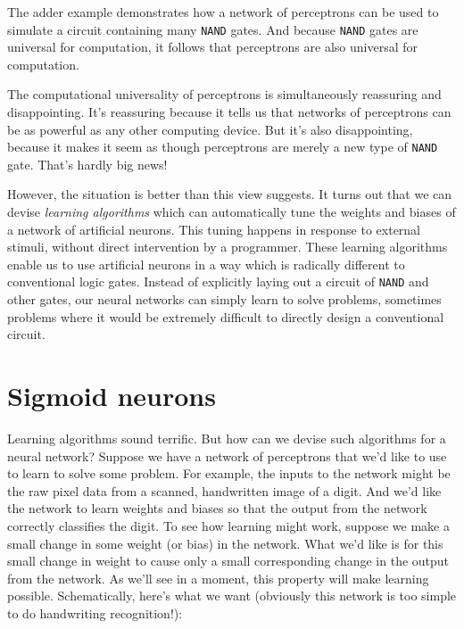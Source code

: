 The adder example demonstrates how a network of perceptrons can be used to simulate a circuit containing many \lstinline{NAND} gates. And because \lstinline{NAND} gates are universal for computation, it follows that perceptrons are also universal for computation.

The computational universality of perceptrons is simultaneously reassuring and disappointing. It's reassuring because it tells us that networks of perceptrons can be as powerful as any other computing device. But it's also disappointing, because it makes it seem as though perceptrons are merely a new type of \lstinline{NAND} gate. That's hardly big news!

However, the situation is better than this view suggests. It turns out that we can devise \textit{learning algorithms} which can automatically tune the weights and biases of a network of artificial neurons. This tuning happens in response to external stimuli, without direct intervention by a programmer. These learning algorithms enable us to use artificial neurons in a way which is radically different to conventional logic gates. Instead of explicitly laying out a circuit of \lstinline{NAND} and other gates, our neural networks can simply learn to solve problems, sometimes problems where it would be extremely difficult to directly design a conventional circuit.

\section{Sigmoid neurons}

Learning algorithms sound terrific. But how can we devise such algorithms for a neural network? Suppose we have a network of perceptrons that we'd like to use to learn to solve some problem. For example, the inputs to the network might be the raw pixel data from a scanned, handwritten image of a digit. And we'd like the network to learn weights and biases so that the output from the network correctly classifies the digit. To see how learning might work, suppose we make a small change in some weight (or bias) in the network. What we'd like is for this small change in weight to cause only a small corresponding change in the output from the network. As we'll see in a moment, this property will make learning possible. Schematically, here's what we want (obviously this network is too simple to do handwriting recognition!):

